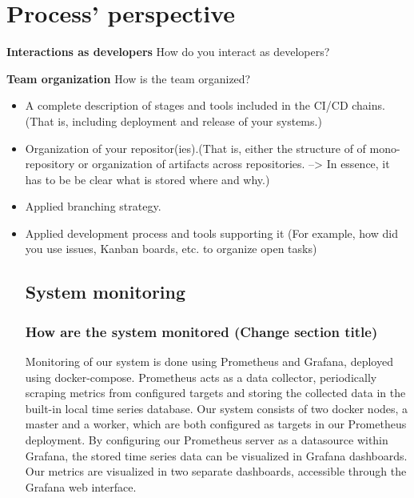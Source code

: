 \section{Process' perspective}

\textbf{Interactions as developers}\newline
 How do you interact as developers?\newline
 
\newline
\textbf{Team organization}\newline
  How is the team organized?\newline
  \begin{itemize}
  \item A complete description of stages and tools included in the CI/CD chains.(That is, including deployment and release of your systems.)
  \item Organization of your repositor(ies).(That is, either the structure of of mono-repository or organization of artifacts across repositories. --> In essence, it has to be be clear what is stored where and why.)
  \item Applied branching strategy.
  \item Applied development process and tools supporting it (For example, how did you use issues, Kanban boards, etc. to organize open tasks)
  \subsection{System monitoring}
  \subsubsection{How are the system monitored (Change section title)}
  Monitoring of our system is done using Prometheus and Grafana, deployed using docker-compose. \newline
  Prometheus acts as a data collector, periodically scraping metrics from configured targets and storing the collected data in the built-in local time series database.\newline
  Our system consists of two docker nodes, a master and a worker, which are both configured as targets in our Prometheus deployment.\newline
  By configuring our Prometheus server as a datasource within Grafana, the stored time series data can be visualized in Grafana dashboards. Our metrics are visualized in two separate dashboards, accessible through the Grafana web interface.


\end{itemize}

